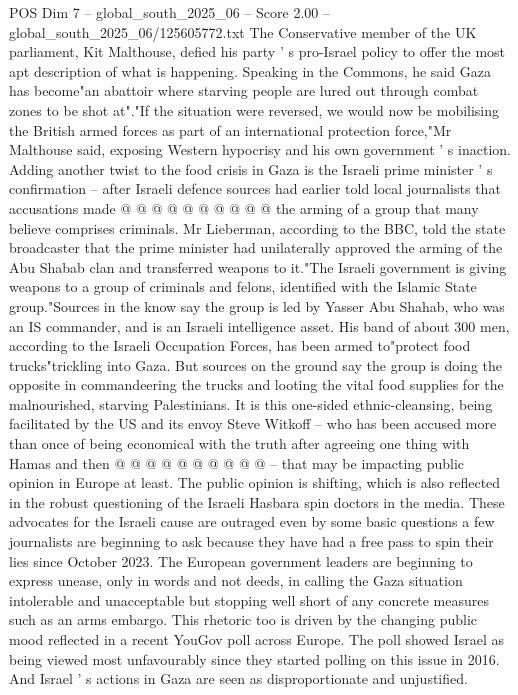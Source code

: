 \begin{textsample}{POS Dim 7 – global\_south\_2025\_06 – Score 2.00 – global\_south\_2025\_06/125605772.txt}
The Conservative member of the UK parliament, Kit Malthouse, defied his party ' s pro-Israel policy to offer the most apt description of what is happening.
Speaking in the Commons, he said Gaza has become"an abattoir where starving people are lured out through combat zones to be shot at"."If the situation were reversed, we would now be mobilising the British armed forces as part of an international protection force,"Mr Malthouse said, exposing Western hypocrisy and his own government ' s inaction.
Adding another twist to the food crisis in Gaza is the Israeli prime minister ' s confirmation -- after Israeli defence sources had earlier told local journalists that accusations made @ @ @ @ @ @ @ @ @ @ the arming of a group that many believe comprises criminals.
Mr Lieberman, according to the BBC, told the state broadcaster that the prime minister had unilaterally approved the arming of the Abu Shabab clan and transferred weapons to it."The Israeli government is giving weapons to a group of criminals and felons, identified with the Islamic State group."Sources in the know say the group is led by Yasser Abu Shahab, who was an IS commander, and is an Israeli intelligence asset.
His band of about 300 men, according to the Israeli Occupation Forces, has been armed to"protect food trucks"trickling into Gaza.
But sources on the ground say the group is doing the opposite in commandeering the trucks and looting the vital food supplies for the malnourished, starving Palestinians.
It is this one-sided ethnic-cleansing, being facilitated by the US and its envoy Steve Witkoff -- who has been accused more than once of being economical with the truth after agreeing one thing with Hamas and then @ @ @ @ @ @ @ @ @ @ -- that may be impacting public opinion in Europe at least.
The public opinion is shifting, which is also reflected in the robust questioning of the Israeli Hasbara spin doctors in the media.
These advocates for the Israeli cause are outraged even by some basic questions a few journalists are beginning to ask because they have had a free pass to spin their lies since October 2023.
The European government leaders are beginning to express unease, only in words and not deeds, in calling the Gaza situation intolerable and unacceptable but stopping well short of any concrete measures such as an arms embargo.
This rhetoric too is driven by the changing public mood reflected in a recent YouGov poll across Europe.
The poll showed Israel as being viewed most unfavourably since they started polling on this issue in 2016.
And Israel ' s actions in Gaza are seen as disproportionate and unjustified.

\end{textsample}
